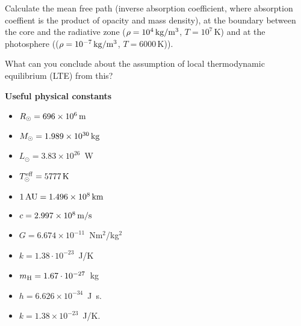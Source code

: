 \documentclass[12pt]{article}
\begin{document}
Calculate the mean free path (inverse absorption coefficient, where absorption coeffient is the product of opacity and mass density), at the boundary between the core and the radiative zone ($\rho=10^4\,{\rm kg/m^3}$, $T=10^7$\,K) and at the photosphere (($\rho=10^{-7}\,{\rm kg/m^3}$, $T=6000$\,K)). 

What can you conclude about the assumption of local thermodynamic equilibrium (LTE) from this?

{\bf Useful physical constants}
\begin{itemize}
  \item $R_{\odot} = 696 \times 10^6\,{\rm m}$
  \item $M_{\odot} = 1.989 \times 10^{30}\,{\rm kg}$
  \item $L_{\odot} = 3.83 \times 10^{26}$~W
  \item $T^{\rm eff}_{\odot} = 5777\,{\rm K}$
  \item $1\,{\rm AU} = 1.496 \times 10^8\,{\rm km}$
  \item $c = 2.997 \times 10^8\,{\rm m/s}$
  \item $G = 6.674 \times 10^{-11}$~Nm$^2$/kg$^2$
  \item $k = 1.38\cdot10^{-23}$~J/K
  \item $m_{\rm H} = 1.67\cdot10^{-27}$~kg
  \item $h=6.626 \times 10^{-34}$~J~s.
  \item $k=1.38 \times 10^{-23}$~J/K.
\end{itemize}
\end{document}
